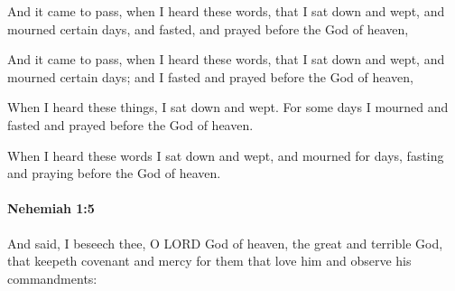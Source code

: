 			And it came to pass, when I heard these words, that I sat down and wept, and mourned certain days, and fasted, and prayed before the God of heaven,

			\begin{versebox}
					\item[BHS] 
					\item[LXX] 
					\item[ASV] And it came to pass, when I heard these words, that I sat down and wept, and mourned certain days; and I fasted and prayed before the God of heaven,
					\item[NIV] When I heard these things, I sat down and wept. For some days I mourned and fasted and prayed before the God of heaven.
					\item[NRSV] When I heard these words I sat down and wept, and mourned for days, fasting and praying before the God of heaven.
			\end{versebox}

		\paragraph{Nehemiah 1:5} %
			\label{NEHEMIAH-1-5}

			And said, I beseech thee, O LORD God of heaven, the great and terrible God, that keepeth covenant and mercy for them that love him and observe his commandments:

